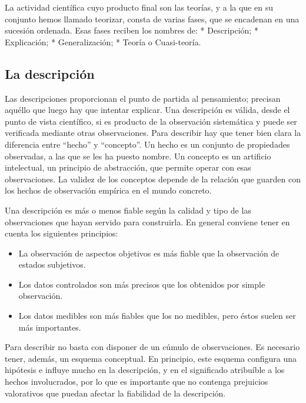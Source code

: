 \documentclass[
]{book}
\providecommand{\tightlist}{%
  \setlength{\itemsep}{0pt}\setlength{\parskip}{0pt}}
\begin{document}
La actividad científica cuyo producto final son las teorías, y a la que en su conjunto hemos llamado teorizar, consta de varias fases, que se encadenan en una sucesión ordenada. Esas fases reciben los nombres de: * Descripción; * Explicación; * Generalización; * Teoría o Cuasi-teoría.

\hypertarget{la-descripciuxf3n}{%
\subsection*{La descripción}\label{la-descripciuxf3n}}

Las descripciones proporcionan el punto de partida al pensamiento; precisan aquéllo que luego hay que intentar explicar. Una descripción es válida, desde el punto de vista científico, si es producto de la observación sistemática y puede ser verificada mediante otras observaciones. Para describir hay que tener bien clara la diferencia entre ``hecho'' y ``concepto''. Un hecho es un conjunto de propiedades observadas, a las que se les ha puesto nombre. Un concepto es un artificio intelectual, un principio de abstracción, que permite operar con esas observaciones. La validez de los conceptos depende de la relación que guarden con los hechos de observación empírica en el mundo concreto.

Una descripción es más o menos fiable según la calidad y tipo de las observaciones que hayan servido para construirla. En general conviene tener en cuenta los siguientes principios:

\begin{itemize}
\tightlist
\item
  La observación de aspectos objetivos es más fiable que la observación de estados subjetivos.
\item
  Los datos controlados son más precisos que los obtenidos por simple observación.
\item
  Los datos medibles son más fiables que los no medibles, pero éstos suelen ser más importantes.
\end{itemize}

Para describir no basta con disponer de un cúmulo de observaciones. Es necesario tener, además, un esquema conceptual. En principio, este esquema configura una hipótesis e influye mucho en la descripción, y en el significado atribuíble a los hechos involucrados, por lo que es importante que no contenga prejuicios valorativos que puedan afectar la fiabilidad de la descripción.
\end{document}
